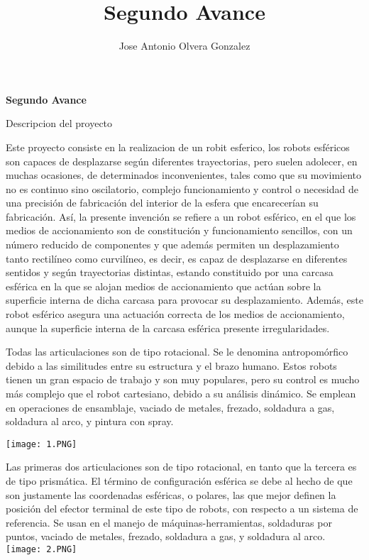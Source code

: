 \documentclass[12pt,letterpaper]{report}
\author{Jose Antonio Olvera Gonzalez }
\title{Segundo Avance }
\begin{document}
\begin{center}
\textbf{Segundo Avance}
\begin{flushleft}
Descripcion del proyecto 
\begin{flushleft}
Este proyecto consiste en la realizacion de un robit esferico, los robots esféricos son capaces de desplazarse según diferentes trayectorias, pero suelen adolecer, en muchas ocasiones, de determinados inconvenientes, tales como que su movimiento no es continuo sino oscilatorio, complejo funcionamiento y control o necesidad de una precisión de fabricación del interior de la esfera que encarecerían su fabricación. Así, la presente invención se refiere a un robot esférico, en el que los medios de accionamiento son de constitución y funcionamiento sencillos, con un número reducido de componentes y que además permiten un desplazamiento tanto rectilíneo como curvilíneo, es decir, es capaz de desplazarse en diferentes sentidos y según trayectorias distintas, estando constituido por una carcasa esférica en la que se alojan medios de accionamiento que actúan sobre la superficie interna de dicha carcasa para provocar su desplazamiento. Además, este robot esférico asegura una actuación correcta de los medios de accionamiento, aunque la superficie interna de la carcasa esférica presente irregularidades.
\begin{flushleft}
Todas las articulaciones son de tipo rotacional. Se le denomina antropomórfico debido a las similitudes entre su estructura y el brazo humano. Estos robots tienen un gran espacio de trabajo y son muy populares, pero su control es mucho más complejo que el robot cartesiano, debido a su análisis dinámico. Se emplean en operaciones de ensamblaje, vaciado de metales, frezado, soldadura a gas, soldadura al arco, y pintura con spray.\\
\begin{center}
\texttt{[image: 1.PNG]} 
\begin{flushleft}
Las primeras dos articulaciones son de tipo rotacional, en tanto que la tercera es de tipo prismática. El término de configuración esférica se debe al hecho de que son justamente las coordenadas esféricas, o polares, las que mejor definen la posición del efector terminal de este tipo de robots, con respecto a un sistema de referencia. Se usan en el manejo de máquinas-herramientas, soldaduras por puntos, vaciado de metales, frezado, soldadura a gas, y soldadura al arco.\\
\texttt{[image: 2.PNG]} 
\begin{flushleft}

\end{flushleft}
\end{flushleft}
\end{center}
\end{flushleft}
\end{flushleft}
\end{flushleft}
\end{center}
\end{document}
